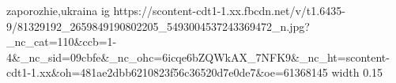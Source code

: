  
 
 
 
 

\par
zaporozhie,ukraina
\ifcmt
  ig https://scontent-cdt1-1.xx.fbcdn.net/v/t1.6435-9/81329192_2659849190802205_5493004537243369472_n.jpg?_nc_cat=110&ccb=1-4&_nc_sid=09cbfe&_nc_ohc=6icqe6bZQWkAX_7NFK9&_nc_ht=scontent-cdt1-1.xx&oh=481ae2dbb6210823f56c36520d7e0de7&oe=61368145
  width 0.15
\fi
